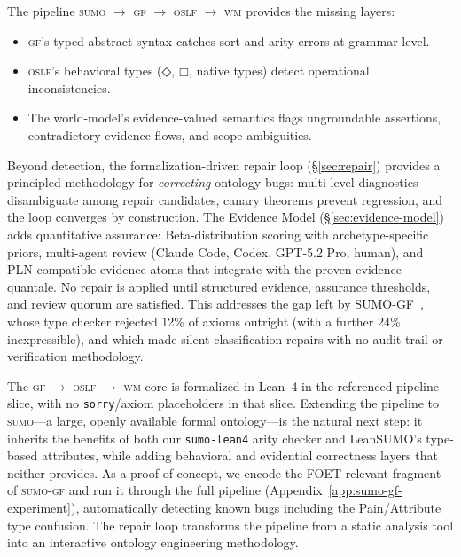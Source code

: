 \documentclass[11pt]{article}
\newcommand{\DiamondOp}{\mathbin{\Diamond}}
\newcommand{\BoxOp}{\mathbin{\Box}}
\newcommand{\SUMO}{\textsc{sumo}}
\newcommand{\GF}{\textsc{gf}}
\newcommand{\OSLF}{\textsc{oslf}}
\newcommand{\WM}{\textsc{wm}}
\theoremstyle{definition}
\theoremstyle{plain}
\begin{document}
The pipeline \SUMO{} $\to$ \GF{} $\to$ \OSLF{} $\to$ \WM{} provides
the missing layers:
\begin{itemize}[nosep]
  \item \GF{}'s typed abstract syntax catches sort and arity errors
    at grammar level.
  \item \OSLF{}'s behavioral types ($\DiamondOp$, $\BoxOp$, native
    types) detect operational inconsistencies.
  \item The world-model's evidence-valued semantics flags ungroundable
    assertions, contradictory evidence flows, and scope ambiguities.
\end{itemize}

Beyond detection, the formalization-driven repair loop
(\S\ref{sec:repair}) provides a principled methodology for
\emph{correcting} ontology bugs: multi-level diagnostics disambiguate
among repair candidates, canary theorems prevent regression, and the
loop converges by construction.  The Evidence Model
(\S\ref{sec:evidence-model}) adds quantitative assurance:
Beta-distribution scoring with archetype-specific priors,
multi-agent review (Claude Code, Codex, GPT-5.2 Pro, human),
and PLN-compatible evidence atoms that integrate with the
proven evidence quantale.  No repair is applied until structured
evidence, assurance thresholds, and review quorum are satisfied.
This addresses the gap left by
SUMO-GF~\cite{enache2012sumogf}, whose type checker rejected 12\% of
axioms outright (with a further 24\% inexpressible), and which made
silent classification repairs with no audit trail or verification
methodology.

The \GF{} $\to$ \OSLF{} $\to$ \WM{} core is formalized in Lean~4 in the
referenced pipeline slice, with no \texttt{sorry}/axiom placeholders in that
slice.
Extending the pipeline to \SUMO{}---a large, openly available formal ontology---is
the natural next step: it inherits the benefits of both our
\texttt{sumo-lean4} arity checker and LeanSUMO's type-based
attributes, while adding behavioral and evidential correctness
layers that neither provides.  As a proof of concept, we encode the
FOET-relevant fragment of \SUMO{}-\GF{} and run it through the full
pipeline (Appendix~\ref{app:sumo-gf-experiment}), automatically
detecting known bugs including the Pain/Attribute type confusion.
The repair loop transforms the pipeline from a static analysis tool
into an interactive ontology engineering methodology.
\end{document}
